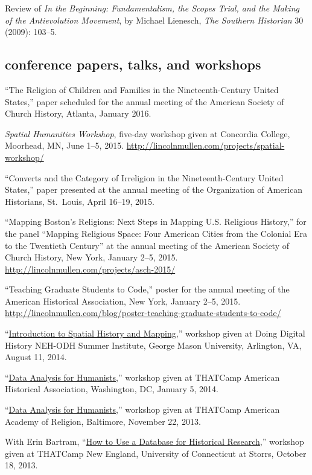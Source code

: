 \documentclass[11pt]{article}
\begin{document}
Review of \emph{In the Beginning: Fundamentalism, the Scopes Trial, and
the Making of the Antievolution Movement}, by Michael Lienesch,
\emph{The Southern Historian} 30 (2009): 103--5.

\subsection{conference papers, talks, and
workshops}\label{conference-papers-talks-and-workshops}

``The Religion of Children and Families in the Nineteenth-Century United 
States,'' paper scheduled for the annual meeting of the American Society of 
Church History, Atlanta, January 2016.

\emph{Spatial Humanities Workshop}, five-day workshop given at Concordia 
College, Moorhead, MN, June 1--5, 2015. 
\url{http://lincolnmullen.com/projects/spatial-workshop/}

``Converts and the Category of Irreligion in the Nineteenth-Century
United States,'' paper presented at the annual meeting of the
Organization of American Historians, St.~Louis, April 16--19, 2015.

``Mapping Boston's Religions: Next Steps in Mapping U.S. Religious History,'' 
for the panel ``Mapping Religious Space: Four American Cities from the 
Colonial Era to the Twentieth Century'' at the annual meeting of the American 
Society of Church History, New York, January 2--5, 2015.  
\url{http://lincolnmullen.com/projects/asch-2015/}

``Teaching Graduate Students to Code,'' poster for the annual meeting of the
American Historical Association, New York, January 2--5, 2015.
\url{http://lincolnmullen.com/blog/poster-teaching-graduate-students-to-code/}

``\href{/workshops/}{Introduction to Spatial History and Mapping},''
workshop given at Doing Digital History NEH-ODH Summer Institute, George
Mason University, Arlington, VA, August 11, 2014.

``\href{/workshops/}{Data Analysis for Humanists},'' workshop given at
THATCamp American Historical Association, Washington, DC, January 5,
2014.

``\href{/workshops/}{Data Analysis for Humanists},'' workshop given at
THATCamp American Academy of Religion, Baltimore, November 22, 2013.

With Erin Bartram, ``\href{/workshops/}{How to Use a Database for
Historical Research},'' workshop given at THATCamp New England,
University of Connecticut at Storrs, October 18, 2013.
\end{document}
